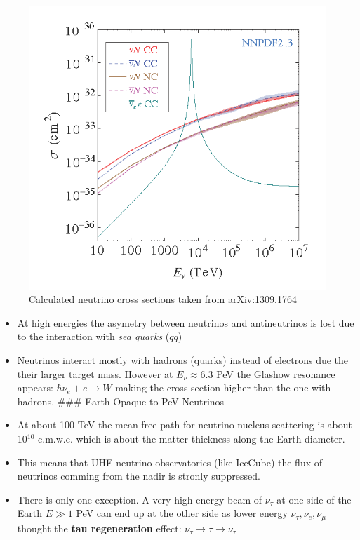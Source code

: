 \documentclass[
  letterpaper,
  DIV=11,
  numbers=noendperiod]{scrreprt}
\begin{document}
\begin{figure}[H]

{\centering \includegraphics{images/uhenucx.png}

}

\caption{Calculated neutrino cross sections taken from
\href{http://arxiv.org/abs/1309.1764}{arXiv:1309.1764}}

\end{figure}%

\begin{itemize}
\item
  At high energies the asymetry between neutrinos and antineutrinos is
  lost due to the interaction with \emph{sea quarks} (\(q\bar{q}\))
\item
  Neutrinos interact mostly with hadrons (quarks) instead of electrons
  due the their larger target mass. However at \(E_\nu \approx 6.3\) PeV
  the Glashow resonance appears: \({\hbar \nu_e} + e \rightarrow W\)
  making the cross-section higher than the one with hadrons. \#\#\#
  Earth Opaque to PeV Neutrinos
\item
  At about 100 TeV the mean free path for neutrino-nucleus scattering is
  about 10\(^{10}\) c.m.w.e. which is about the matter thickness along
  the Earth diameter.
\item
  This means that UHE neutrino observatories (like IceCube) the flux of
  neutrinos comming from the nadir is stronly suppressed.
\item
  There is only one exception. A very high energy beam of \(\nu_\tau\)
  at one side of the Earth \(E\gg 1\) PeV can end up at the other side
  as lower energy \(\nu_\tau, \nu_e,\nu_\mu\) thought the \textbf{tau
  regeneration} effect:
  \(\nu_\tau \rightarrow \tau \rightarrow \nu_\tau\)
\end{itemize}
\end{document}
